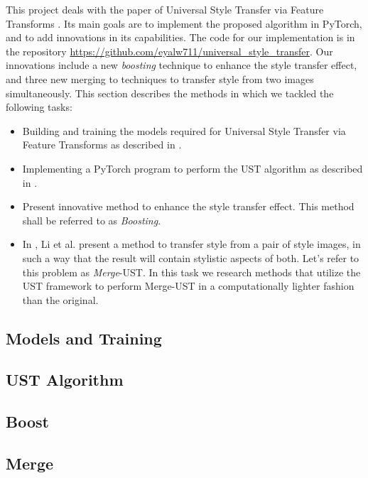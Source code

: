 \hspace{0.5cm} This project deals with the paper of Universal Style Transfer via Feature Transforms \cite{bib11}. Its main goals are to implement the proposed algorithm in PyTorch, and to add innovations in its capabilities. The code for our implementation is in the repository \url{https://github.com/eyalw711/universal_style_transfer}. Our innovations include a new \textit{boosting} technique to enhance the style transfer effect, and three new merging to techniques to transfer style from two images simultaneously. This section describes the methods in which we tackled the following tasks: 
\begin{itemize}
	\item Building and training the models required for Universal Style Transfer via Feature Transforms as described in \cite{bib11}.
	\item Implementing a PyTorch program to perform the UST algorithm as described in \cite{bib11}.
	\item Present innovative method to enhance the style transfer effect. This method shall be referred to as \textit{Boosting}.
	\item In \cite{bib11}, Li et al. present a method to transfer style from a pair of style images, in such a way that the result will contain stylistic aspects of both. Let's refer to this problem as \textit{Merge}-UST. In this task we research methods that utilize the UST framework to perform Merge-UST in a computationally lighter fashion than the original.
\end{itemize}


\subsection{Models and Training}\label{subsec:Models}
\label{models_methods_lbl}


\subsection{UST Algorithm}
\label{algo_methods_lbl}


\subsection{Boost}
\label{boost_methods_lbl}


\subsection{Merge}
\label{merge_methods_lbl}
